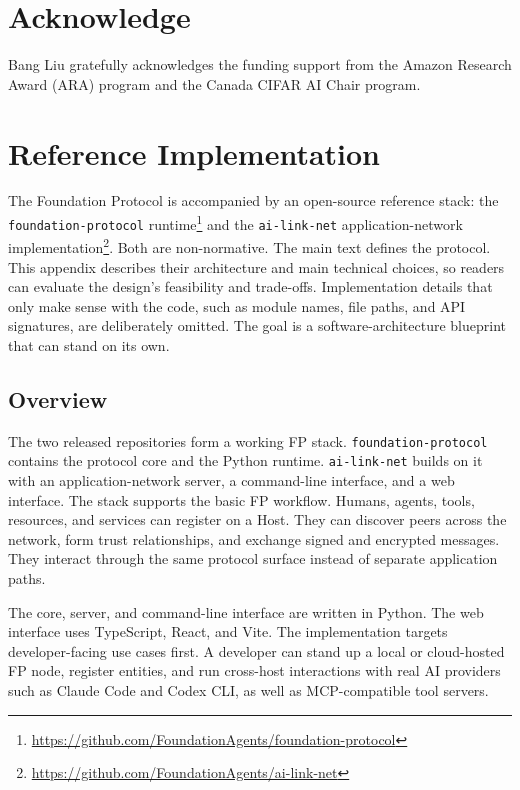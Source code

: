 \documentclass{llmxive}
\begin{document}
\section*{Acknowledge}
\label{sec:ack}
Bang Liu gratefully acknowledges the funding support from the Amazon Research Award (ARA) program and the Canada CIFAR AI Chair program.






\appendix

\section{Reference Implementation}
\label{app:ref}

The Foundation Protocol is accompanied by an open-source reference stack:
the \texttt{foundation-protocol} runtime\footnote{
\url{https://github.com/FoundationAgents/foundation-protocol}}
and the \texttt{ai-link-net} application-network implementation\footnote{
\url{https://github.com/FoundationAgents/ai-link-net}}.
Both are non-normative. The main text defines the protocol. This appendix describes their architecture and main technical choices, so readers can evaluate the design's feasibility and trade-offs.
Implementation details that only make sense with the code, such as module names, file paths, and API signatures, are deliberately omitted. The goal is a software-architecture blueprint that can stand on its own.

\subsection{Overview}
\label{app:overview}

The two released repositories form a working FP stack. \texttt{foundation-protocol} contains the protocol core and the Python runtime. \texttt{ai-link-net} builds on it with an application-network server, a command-line interface, and a web interface.
The stack supports the basic FP workflow. Humans, agents, tools, resources, and services can register on a Host. They can discover peers across the network, form trust relationships, and exchange signed and encrypted messages. They interact through the same protocol surface instead of separate application paths.

The core, server, and command-line interface are written in Python. The web interface uses TypeScript, React, and Vite. The implementation targets developer-facing use cases first. A developer can stand up a local or cloud-hosted FP node, register entities, and run cross-host interactions with real AI providers such as Claude Code and Codex CLI, as well as MCP-compatible tool servers.
\end{document}
